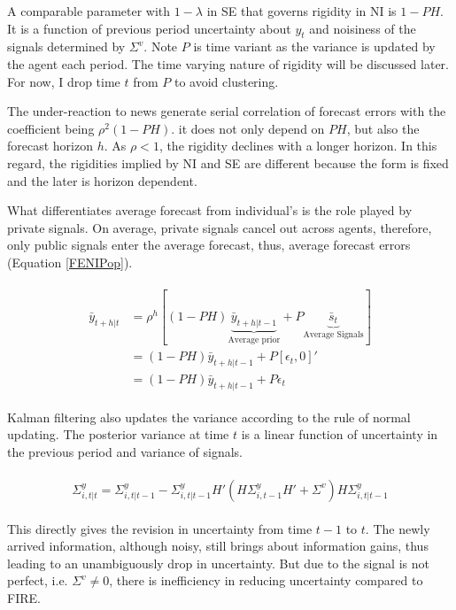 \documentclass[12pt]{article}
\begin{document}
	
	A comparable parameter with $1-\lambda$ in SE that governs rigidity in NI is $1-PH$. It is a function of previous period uncertainty about $y_t$ and noisiness of the signals determined by $\Sigma^v$. Note $P$ is time variant as the variance is updated by the agent each period. The time varying nature of rigidity will be discussed later. For now, I drop time $t$ from $P$ to avoid clustering.  
	
	The under-reaction to news generate serial correlation of forecast errors with the coefficient being $\rho^2(1-PH)$. it does not only depend on $PH$, but also the forecast horizon $h$. As $\rho<1$, the rigidity declines with a longer horizon. In this regard, the rigidities implied by NI and SE are different because the form is fixed and the later is horizon dependent. 
	
	What differentiates average forecast from individual's is the role played by private signals. On average, private signals cancel out across agents, therefore, only public signals enter the average forecast, thus, average forecast errors (Equation \ref{FENIPop}). 
	
	\begin{eqnarray}\label{FENIPop}
		\begin{aligned}
			\bar y_{t+h|t} & = \rho^h [(1-PH) \underbrace{\bar  y_{t+h|t-1}}_{\text{Average prior}} + P \underbrace{\bar s_{t}}_{\text{Average Signals}}] \\
			& = (1-PH) \bar y_{t+h|t-1}+ P [\epsilon_t, 0]' \\
			& = (1-PH) \bar y_{t+h|t-1} + P \epsilon_t
		\end{aligned}
	\end{eqnarray}
	
	Kalman filtering also updates the variance according to the rule of normal updating.   The posterior variance at time $t$ is a linear function of uncertainty in the previous period and variance of signals. 
	
	\begin{eqnarray}
		\begin{aligned}
			\Sigma^y_{i,t|t} = \Sigma^y_{i,t|t-1} - \Sigma^y_{i,t|t-1} H'(H \Sigma^y_{i,t-1} H' +\Sigma^v) H \Sigma^y_{i,t|t-1} 
		\end{aligned}
	\end{eqnarray}
	
	This directly gives the revision in uncertainty from time $t-1$ to $t$. The newly arrived information, although noisy, still brings about information gains, thus leading to an unambiguously drop in uncertainty. But due to the signal is not perfect, i.e. $\Sigma^v \neq 0$, there is inefficiency in reducing uncertainty compared to FIRE. 
	
\end{document}
